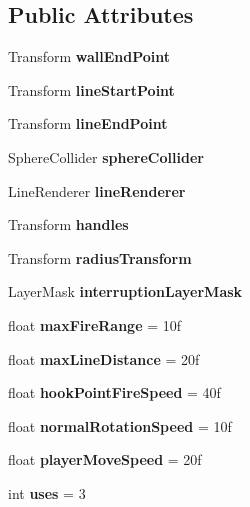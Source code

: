 \subsection*{Public Attributes}
\begin{DoxyCompactItemize}
\item 
\hypertarget{class_zipline_a6fe8b6c388651c05ef94c91b13542301}{}\label{class_zipline_a6fe8b6c388651c05ef94c91b13542301} 
Transform {\bfseries wall\+End\+Point}
\item 
\hypertarget{class_zipline_a33ae97f498fa72c01d3eb183d1b031e1}{}\label{class_zipline_a33ae97f498fa72c01d3eb183d1b031e1} 
Transform {\bfseries line\+Start\+Point}
\item 
\hypertarget{class_zipline_ab59f3ed50715ec9ab3c97d5405170b3a}{}\label{class_zipline_ab59f3ed50715ec9ab3c97d5405170b3a} 
Transform {\bfseries line\+End\+Point}
\item 
\hypertarget{class_zipline_ade3b3fb657098f7aebbd03b3d3b60721}{}\label{class_zipline_ade3b3fb657098f7aebbd03b3d3b60721} 
Sphere\+Collider {\bfseries sphere\+Collider}
\item 
\hypertarget{class_zipline_ad0ae5bbdf617a006fa1fd17d2acbbaf9}{}\label{class_zipline_ad0ae5bbdf617a006fa1fd17d2acbbaf9} 
Line\+Renderer {\bfseries line\+Renderer}
\item 
\hypertarget{class_zipline_a78eaf1c91b2a5f5f37cd0e6761c48ea6}{}\label{class_zipline_a78eaf1c91b2a5f5f37cd0e6761c48ea6} 
Transform {\bfseries handles}
\item 
\hypertarget{class_zipline_ad6fafbe1917f13b0003f77d1cc494347}{}\label{class_zipline_ad6fafbe1917f13b0003f77d1cc494347} 
Transform {\bfseries radius\+Transform}
\item 
\hypertarget{class_zipline_a7496aa1879025f72b1b8e0a3f7a635a6}{}\label{class_zipline_a7496aa1879025f72b1b8e0a3f7a635a6} 
Layer\+Mask {\bfseries interruption\+Layer\+Mask}
\item 
\hypertarget{class_zipline_a997f2519046dafcbb1a97b53eead4e76}{}\label{class_zipline_a997f2519046dafcbb1a97b53eead4e76} 
float {\bfseries max\+Fire\+Range} = 10f
\item 
\hypertarget{class_zipline_ad0d0f45110a2dbb964fe19037c3858a9}{}\label{class_zipline_ad0d0f45110a2dbb964fe19037c3858a9} 
float {\bfseries max\+Line\+Distance} = 20f
\item 
\hypertarget{class_zipline_ac7274dfca742ca0503fdae6996661a3d}{}\label{class_zipline_ac7274dfca742ca0503fdae6996661a3d} 
float {\bfseries hook\+Point\+Fire\+Speed} = 40f
\item 
\hypertarget{class_zipline_a0bc0d3325e4f18a3c19962f27ecb4a4a}{}\label{class_zipline_a0bc0d3325e4f18a3c19962f27ecb4a4a} 
float {\bfseries normal\+Rotation\+Speed} = 10f
\item 
\hypertarget{class_zipline_ac42fa14913962b51744c865885b38c32}{}\label{class_zipline_ac42fa14913962b51744c865885b38c32} 
float {\bfseries player\+Move\+Speed} = 20f
\item 
\hypertarget{class_zipline_abb927cc3f7719718a633831910697a8a}{}\label{class_zipline_abb927cc3f7719718a633831910697a8a} 
int {\bfseries uses} = 3
\end{DoxyCompactItemize}
